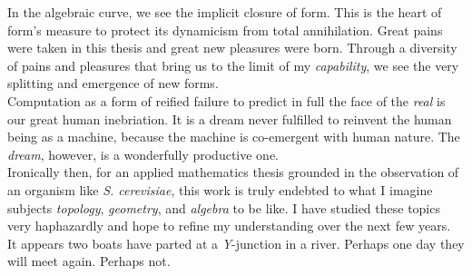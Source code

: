 In the algebraic curve, we see the implicit closure 
of form. This is the heart of form's measure 
to protect its dynamicism from total annihilation.
Great pains were taken in this thesis and great new pleasures were 
born. Through a diversity of pains and pleasures that 
bring us to the limit of my \textit{capability}, 
we see the very splitting and emergence of new forms.
\\

Computation as a form of reified failure to predict 
in full the face of the \textit{real} is 
our great human inebriation. It is a dream 
never fulfilled to reinvent the human being 
as a machine, because the machine is co-emergent with
human nature. The \textit{dream}, however, 
is a wonderfully productive one.
\\

Ironically then, for an applied mathematics thesis grounded 
in the observation of an organism like \textit{S. cerevisiae},
this work is truly endebted to what I imagine 
subjects \textit{topology}, \textit{geometry}, and 
\textit{algebra} to be like. I have studied 
these topics very haphazardly and hope to refine my 
understanding over the next few years.
\\

It appears two boats have parted at a \textit{Y}-junction in a river. 
Perhaps one day they will meet again. Perhaps not.
\\
